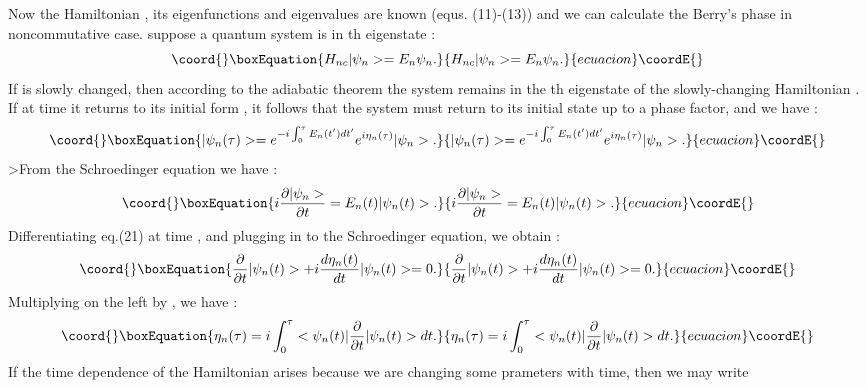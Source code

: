 \documentclass[a4paper,a4paper]{article}
\begin{document}
Now the Hamiltonian \coordHE{}, its eigenfunctions \coordHE{} and
eigenvalues \coordHE{} are known (equs. (11)-(13)) and we can
calculate the Berry's phase in noncommutative case. suppose a
quantum system is in \coordHE{}th eigenstate :
\begin{equation}\coord{}\boxEquation{
H_{nc}|\psi_{n}>=E_{n}\psi_{n} .
}{
H_{nc}|\psi_{n}>=E_{n}\psi_{n} .
}{ecuacion}\coordE{}\end{equation}
If \coordHE{} is slowly changed, then according to the adiabatic
theorem the system remains in the \coordHE{}th eigenstate of the
slowly-changing Hamiltonian \coordHE{}. If at time \myHighlight{$\tau$}\coordHE{} it returns
to its initial form \coordHE{}, it follows that
the system must return to its initial state up to a phase factor,
and we have :
\begin{equation}\coord{}\boxEquation{
|\psi_{n}(\tau)>=e^{-i\int_{0}^{\tau}E_{n}(t^{\prime})d
t^{\prime}}e^{i\eta_{n}(\tau)}|\psi_{n}> .
}{
|\psi_{n}(\tau)>=e^{-i\int_{0}^{\tau}E_{n}(t^{\prime})d
t^{\prime}}e^{i\eta_{n}(\tau)}|\psi_{n}> .
}{ecuacion}\coordE{}\end{equation}
>From the Schroedinger equation we have :
\begin{equation}\coord{}\boxEquation{
i\frac{\partial |\psi_{n}>}{\partial t}=E_{n}(t)|\psi_{n}(t)>.
}{
i\frac{\partial |\psi_{n}>}{\partial t}=E_{n}(t)|\psi_{n}(t)>.
}{ecuacion}\coordE{}\end{equation}
Differentiating eq.(21) at time \coordHE{}, and plugging in to the
Schroedinger equation, we obtain :
\begin{equation}\coord{}\boxEquation{
\frac{\partial}{\partial t}|\psi_{n}(t)>+i\frac{d\eta_{n}(t)}{d
t}|\psi_{n}(t)>=0.
}{
\frac{\partial}{\partial t}|\psi_{n}(t)>+i\frac{d\eta_{n}(t)}{d
t}|\psi_{n}(t)>=0.
}{ecuacion}\coordE{}\end{equation}
Multiplying on the left by \coordHE{}, we have :
\begin{equation}\coord{}\boxEquation{
\eta_{n}(\tau)=i\int_{0}^{\tau}<\psi_{n}(t)|\frac{\partial}{\partial
t }|\psi_{n}(t)> d t  .
}{
\eta_{n}(\tau)=i\int_{0}^{\tau}<\psi_{n}(t)|\frac{\partial}{\partial
t }|\psi_{n}(t)> d t  .
}{ecuacion}\coordE{}\end{equation}
If the time dependence of the Hamiltonian arises because we are
changing some prameters \coordHE{} with time, then we may write
\end{document}
